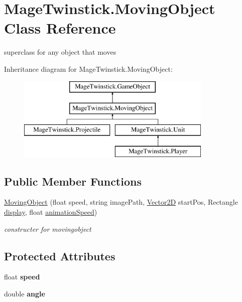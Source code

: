 \hypertarget{class_mage_twinstick_1_1_moving_object}{}\section{Mage\+Twinstick.\+Moving\+Object Class Reference}
\label{class_mage_twinstick_1_1_moving_object}


superclass for any object that moves  


Inheritance diagram for Mage\+Twinstick.\+Moving\+Object\+:\begin{figure}[H]
\begin{center}
\leavevmode
\includegraphics[height=4.000000cm]{class_mage_twinstick_1_1_moving_object}
\end{center}
\end{figure}
\subsection*{Public Member Functions}
\begin{DoxyCompactItemize}
\item 
\hyperlink{class_mage_twinstick_1_1_moving_object_ab600a7d67a921669d7021f9c8b7b9891}{Moving\+Object} (float speed, string image\+Path, \hyperlink{class_mage_twinstick_1_1_vector2_d}{Vector2\+D} start\+Pos, Rectangle \hyperlink{class_mage_twinstick_1_1_game_object_a5807df7f837dc87c8955a008d0b27b50}{display}, float \hyperlink{class_mage_twinstick_1_1_game_object_a5d21c31402c27c5a19f2a62d98720456}{animation\+Speed})
\begin{DoxyCompactList}\small\item\em constructer for movingobject \end{DoxyCompactList}\end{DoxyCompactItemize}
\subsection*{Protected Attributes}
\begin{DoxyCompactItemize}
\item 
\hypertarget{class_mage_twinstick_1_1_moving_object_ac7f09bc1fd21342a3c68b1d25c7e209d}{}float {\bfseries speed}\label{class_mage_twinstick_1_1_moving_object_ac7f09bc1fd21342a3c68b1d25c7e209d}

\item 
\hypertarget{class_mage_twinstick_1_1_moving_object_a93fbd4b287c423a80a525f4e45b93279}{}double {\bfseries angle}\label{class_mage_twinstick_1_1_moving_object_a93fbd4b287c423a80a525f4e45b93279}

\end{DoxyCompactItemize}
